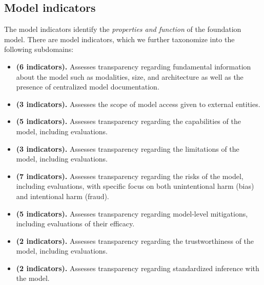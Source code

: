 \hypertarget{model-indicators}{\subsection{Model indicators}}
\label{sec:model-indicators}
The model indicators identify the \emph{properties and function} of the foundation model. 
There are \nummodelindicators model indicators, which we further taxonomize into the following \nummodelsubdomains subdomains:
\begin{itemize}
    \item \textbf{\modelbasics (6 indicators).} 
    Assesses transparency regarding fundamental information about the model such as modalities, size, and architecture as well as the presence of centralized model documentation.
    \item \textbf{\modelaccess (3 indicators).} 
    Assesses the scope of model access given to external entities.
    \item \textbf{\capabilities (5 indicators).} 
    Assesses transparency regarding the capabilities of the model, including evaluations.
    \item \textbf{\limitations (3 indicators).} 
    Assesses transparency regarding the limitations of the model, including evaluations.
    \item \textbf{\risks (7 indicators).} 
    Assesses transparency regarding the risks of the model, including evaluations, with specific focus on both unintentional harm (\eg bias) and intentional harm (\eg fraud).    
    \item \textbf{\modelmitigations (5 indicators).} 
    Assesses transparency regarding model-level mitigations, including evaluations of their efficacy.
    \item \textbf{\trustworthiness (2 indicators).} 
    Assesses transparency regarding the trustworthiness of the model, including evaluations.
    \item \textbf{\inference (2 indicators).} 
    Assesses transparency regarding standardized inference with the model.
\end{itemize}


